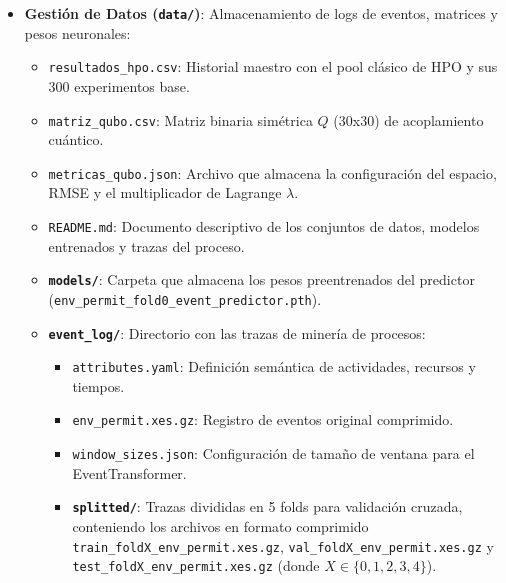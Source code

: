 \begin{itemize}
    \item \textbf{Gestión de Datos (\texttt{data/})}: Almacenamiento de logs de eventos, matrices y pesos neuronales:
    \begin{itemize}
        \item \texttt{resultados\_hpo.csv}: Historial maestro con el pool clásico de HPO y sus 300 experimentos base.
        \item \texttt{matriz\_qubo.csv}: Matriz binaria simétrica $Q$ (30x30) de acoplamiento cuántico.
        \item \texttt{metricas\_qubo.json}: Archivo que almacena la configuración del espacio, RMSE y el multiplicador de Lagrange $\lambda$.
        \item \texttt{README.md}: Documento descriptivo de los conjuntos de datos, modelos entrenados y trazas del proceso.
        \item \textbf{\texttt{models/}}: Carpeta que almacena los pesos preentrenados del predictor (\texttt{env\_permit\_fold0\_event\_predictor.pth}).
        \item \textbf{\texttt{event\_log/}}: Directorio con las trazas de minería de procesos:
        \begin{itemize}
            \item \texttt{attributes.yaml}: Definición semántica de actividades, recursos y tiempos.
            \item \texttt{env\_permit.xes.gz}: Registro de eventos original comprimido.
            \item \texttt{window\_sizes.json}: Configuración de tamaño de ventana para el EventTransformer.
            \item \textbf{\texttt{splitted/}}: Trazas divididas en 5 folds para validación cruzada, conteniendo los archivos en formato comprimido \texttt{train\_foldX\_env\_permit.xes.gz}, \texttt{val\_foldX\_env\_permit.xes.gz} y \texttt{test\_foldX\_env\_permit.xes.gz} (donde $X \in \{0, 1, 2, 3, 4\}$).
        \end{itemize}
    \end{itemize}


\end{itemize}
